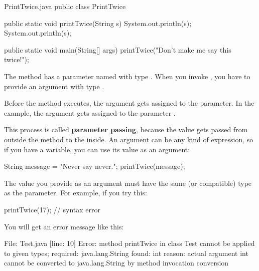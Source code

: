 
\begin{trinket}[295]{PrintTwice.java}
public class PrintTwice {

    public static void printTwice(String s) {
        System.out.println(s);
        System.out.println(s);
    }

    public static void main(String[] args) {
        printTwice("Don't make me say this twice!");
    }
}
\end{trinket}

The  method has a parameter named  with type .
When you invoke , you have to provide an argument with type .


Before the method executes, the argument gets assigned to the parameter.
In the  example, the argument  gets assigned to the parameter .


This process is called {\bf parameter passing}, because the value gets passed from outside the method to the inside.
An argument can be any kind of expression, so if you have a  variable, you can use its value as an argument:

\begin{code}
String message = "Never say never.";
printTwice(message);
\end{code}

The value you provide as an argument must have the same (or compatible) type as the parameter.
For example, if you try this:

\begin{code}
printTwice(17);  // syntax error
\end{code}

You will get an error message like this:

\begin{stdout}
File: Test.java  [line: 10]
Error: method printTwice in class Test cannot be applied
       to given types;
  required: java.lang.String
  found: int
  reason: actual argument int cannot be converted to
          java.lang.String by method invocation conversion
\end{stdout}

